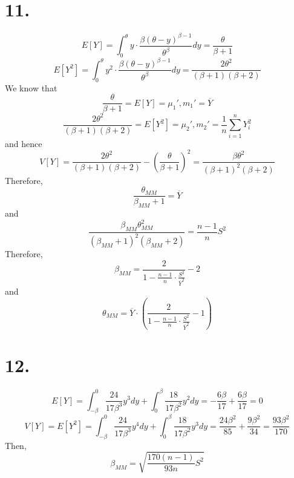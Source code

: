 \documentclass[11pt]{article}
\begin{document}
\section*{11.}
\[
    E[Y] = \int_0^\theta y \cdot \frac{\beta (\theta - y)^{\beta-1}}{\theta^\beta} dy = \frac{\theta}{\beta + 1}
\]
\[
    E[Y^2] = \int_0^\theta y^2 \cdot \frac{\beta (\theta - y)^{\beta-1}}{\theta^\beta} dy = \dfrac{2{\theta}^2}{\left({\beta}+1\right)\left({\beta}+2\right)}
\]
We know that
\[
    \frac{\theta}{\beta + 1} = E[Y] = \mu_1', m_1' = \overline{Y}
\] 
\[
    \frac{2\theta^2}{(\beta+1)(\beta+2)} = E[Y^2] = \mu_2', m_2' = \frac{1}{n}\sum_{i=1}^n Y_i^2  
\]
and hence
\[
    V[Y] = \frac{2\theta^2}{(\beta+1)(\beta+2)} - \left(\frac{\theta}{\beta + 1}\right)^2 = \frac{\beta \theta^{2}}{(\beta + 1)^{2} (\beta + 2)}
\]
Therefore, 
\[
    \frac{\theta_{MM}}{\beta_{MM} + 1} = \overline{Y}    
\]
and 
\[
    \frac{\beta_{MM} \theta_{MM}^{2}}{(\beta_{MM} + 1)^{2} (\beta_{MM} + 2)} = \frac{n-1}{n}S^2
\]
Therefore, 
\[
    \beta_{MM} = \frac{2}{1 - \frac{n-1}{n} \cdot \frac{S^2}{\overline{Y}^2}} - 2    
\]
and 
\[
    \theta_{MM} = \overline{Y} \cdot \left(\frac{2}{1 - \frac{n-1}{n} \cdot \frac{S^2}{\overline{Y}^2}} - 1 \right)    
\]
\pagebreak
\section*{12.}
\[
    E[Y] = \int_{-\beta}^0 \frac{24}{17\beta^3}y^3 dy + \int_0^\beta \frac{18}{17\beta^2}y^2 dy = -\frac{6\beta}{17} + \frac{6\beta}{17} = 0   
\]
\[
    V[Y] = E[Y^2] = \int_{-\beta}^0 \frac{24}{17\beta^3}y^4 dy + \int_0^\beta \frac{18}{17\beta^2}y^3 dy = \frac{24\beta^2}{85} + \frac{9\beta^2}{34} = \frac{93\beta^2}{170}
\]
Then, 
\[
    \beta_{MM} = \sqrt{\frac{170(n-1)}{93n} S^2}   
\]
\pagebreak
\end{document}
